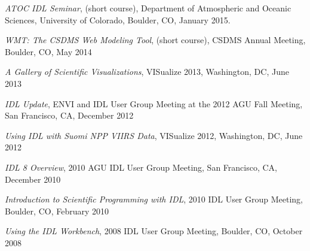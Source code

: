 \begin{enumerate}[{[}1{]}]
  \item \textit{ATOC IDL Seminar}, (short course), Department of
    Atmospheric and Oceanic Sciences, University of Colorado, Boulder,
    CO, January 2015.

  \item \textit{WMT: The CSDMS Web Modeling Tool}, (short course), CSDMS
    Annual Meeting, Boulder, CO, May 2014

  \item \textit{A Gallery of Scientific Visualizations}, {VISualize} 2013,
    Washington, DC, June 2013

  \item \textit{IDL Update}, ENVI and IDL User Group Meeting at the 2012
    AGU Fall Meeting, San Francisco, CA, December 2012

  \item \textit{Using IDL with Suomi NPP VIIRS Data}, {VISualize} 2012,
    Washington, DC, June 2012

  \item \textit{IDL 8 Overview}, 2010 AGU IDL User Group Meeting, San
    Francisco, CA, December 2010

  \item \textit{Introduction to Scientific Programming with IDL}, 2010 IDL
    User Group Meeting, Boulder, CO, February 2010

  \item \textit{Using the IDL Workbench}, 2008 IDL User Group Meeting,
    Boulder, CO, October 2008

\end{enumerate}
